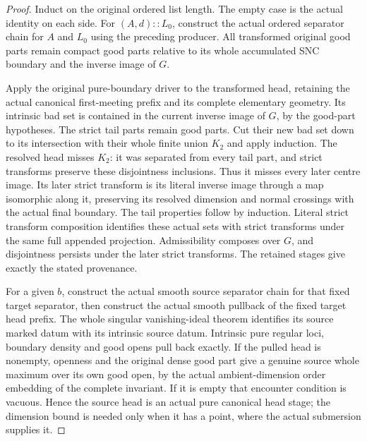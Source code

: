 \begin{proof}
Induct on the original ordered list length. The empty case is the
actual identity on each side. For $(A,d)::L_0$, construct the actual
ordered separator chain for $A$ and $L_0$ using the preceding
producer. All transformed original good parts remain compact good
parts relative to its whole accumulated SNC boundary and the inverse
image of $G$.

Apply the original pure-boundary driver to the transformed head,
retaining the actual canonical first-meeting prefix and its complete
elementary geometry. Its intrinsic bad set is contained in the
current inverse image of $G$, by the good-part hypotheses. The strict
tail parts remain good parts. Cut their new bad set down to its
intersection with their whole finite union $K_2$ and apply induction.
The resolved head misses $K_2$: it was separated from every tail part,
and strict transforms preserve these disjointness inclusions. Thus
it misses every later centre image. Its later strict transform is its
literal inverse image through a map isomorphic along it, preserving
its resolved dimension and normal crossings with the actual final
boundary. The tail properties follow by induction. Literal strict
transform composition identifies these actual sets with strict
transforms under the same full appended projection. Admissibility
composes over $G$, and disjointness persists under the later strict
transforms. The retained stages give exactly the stated provenance.

For a given $b$, construct the actual smooth source separator chain
for that fixed target separator, then construct the actual smooth
pullback of the fixed target head prefix. The whole singular
vanishing-ideal theorem identifies its source marked datum with its
intrinsic source datum. Intrinsic pure regular loci, boundary density
and good opens pull back exactly. If the pulled head is nonempty,
openness and the original dense good part give a genuine source
whole maximum over its own good open, by the actual ambient-dimension
order embedding of the complete invariant. If it is empty that
encounter condition is vacuous. Hence the source head is an actual
pure canonical head stage; the dimension bound is needed only when
it has a point, where the actual submersion supplies it.


\end{proof}
